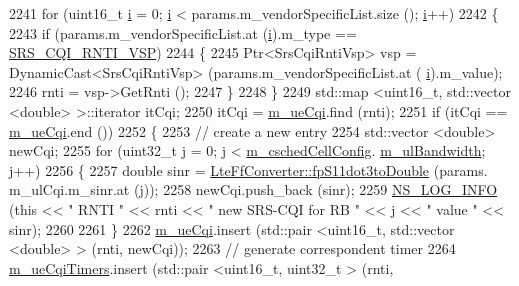 \begin{DoxyCode}
2241         \textcolor{keywordflow}{for} (uint16\_t \hyperlink{bernuolliDistribution_8m_a6f6ccfcf58b31cb6412107d9d5281426}{i} = 0; \hyperlink{bernuolliDistribution_8m_a6f6ccfcf58b31cb6412107d9d5281426}{i} < params.m\_vendorSpecificList.size (); \hyperlink{bernuolliDistribution_8m_a6f6ccfcf58b31cb6412107d9d5281426}{i}++)
2242           \{
2243             \textcolor{keywordflow}{if} (params.m\_vendorSpecificList.at (\hyperlink{bernuolliDistribution_8m_a6f6ccfcf58b31cb6412107d9d5281426}{i}).m\_type == \hyperlink{lte-vendor-specific-parameters_8h_a3b5e6e766032ab4a8e374a1cfd237a26}{SRS\_CQI\_RNTI\_VSP})
2244               \{
2245                 Ptr<SrsCqiRntiVsp> vsp = DynamicCast<SrsCqiRntiVsp> (params.m\_vendorSpecificList.at (
      \hyperlink{bernuolliDistribution_8m_a6f6ccfcf58b31cb6412107d9d5281426}{i}).m\_value);
2246                 rnti = vsp->GetRnti ();
2247               \}
2248           \}
2249         std::map <uint16\_t, std::vector <double> >::iterator itCqi;
2250         itCqi = \hyperlink{classns3_1_1FdTbfqFfMacScheduler_a74c33465af3fd4306d994e9942836a27}{m\_ueCqi}.find (rnti);
2251         \textcolor{keywordflow}{if} (itCqi == \hyperlink{classns3_1_1FdTbfqFfMacScheduler_a74c33465af3fd4306d994e9942836a27}{m\_ueCqi}.end ())
2252           \{
2253             \textcolor{comment}{// create a new entry}
2254             std::vector <double> newCqi;
2255             \textcolor{keywordflow}{for} (uint32\_t j = 0; j < \hyperlink{classns3_1_1FdTbfqFfMacScheduler_a73d5d866713fa06e1cc6186b0f556693}{m\_cschedCellConfig}.
      \hyperlink{structns3_1_1FfMacCschedSapProvider_1_1CschedCellConfigReqParameters_a5ab5b102878e6e7e7727a14af4a64d2f}{m\_ulBandwidth}; j++)
2256               \{
2257                 \textcolor{keywordtype}{double} sinr = \hyperlink{classns3_1_1LteFfConverter_aa5d8c2a8f988dbd63da91818c18666eb}{LteFfConverter::fpS11dot3toDouble} (params.
      m\_ulCqi.m\_sinr.at (j));
2258                 newCqi.push\_back (sinr);
2259                 \hyperlink{group__logging_gafbd73ee2cf9f26b319f49086d8e860fb}{NS\_LOG\_INFO} (\textcolor{keyword}{this} << \textcolor{stringliteral}{" RNTI "} << rnti << \textcolor{stringliteral}{" new SRS-CQI for RB  "} << j << \textcolor{stringliteral}{" value
       "} << sinr);
2260 
2261               \}
2262             \hyperlink{classns3_1_1FdTbfqFfMacScheduler_a74c33465af3fd4306d994e9942836a27}{m\_ueCqi}.insert (std::pair <uint16\_t, std::vector <double> > (rnti, newCqi));
2263             \textcolor{comment}{// generate correspondent timer}
2264             \hyperlink{classns3_1_1FdTbfqFfMacScheduler_a86890d454debae559e2a13f86c0b829c}{m\_ueCqiTimers}.insert (std::pair <uint16\_t, uint32\_t > (rnti, 

\end{DoxyCode}

